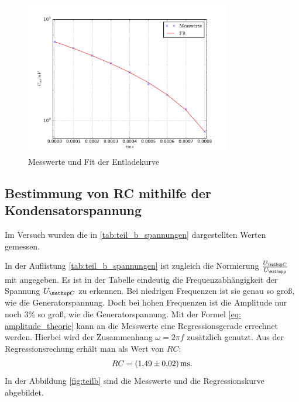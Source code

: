 \begin{figure}
  \centering
  \includegraphics [width=0.8\textwidth]{pics/teil_a_entladung.pdf}
  \caption{Messwerte und Fit der Entladekurve}
  \label{fig:plot_teila}
\end{figure}


\subsection{Bestimmung von RC mithilfe der Kondensatorspannung}
Im Versuch wurden die in \ref{tab:teil_b_spannungen} dargestellten Werten gemessen.



In der Auflistung \ref{tab:teil_b_spannungen} ist zugleich die Normierung $\frac{U\ua{C}}{U\ua{g}}$ %
mit angegeben.
Es ist in der Tabelle eindeutig die Frequenzabhängigkeit der Spannung $U\ua{C}$ zu erkennen. %
Bei niedrigen Frequenzen ist sie genau so groß, wie die Generatorspannung. %
Doch bei hohen Frequenzen ist die Amplitude nur noch $3\%$ so groß, wie die  Generatorspannung. %
Mit der Formel \eqref{eq: amplitude_theorie} kann an die Messwerte eine Regressionsgerade
errechnet werden. Hierbei wird der Zusammenhang $\omega=2\pi f$ zusätzlich genutzt.
Aus der Regressionsrechung erhält man als Wert von $RC$:
\begin{equation}
  \label{eq:rc_teilb}
  RC=\SI{1.49\pm0.02}{\milli\second}.
\end{equation}
In der Abbildung \ref{fig:teilb} sind die Messwerte und die Regressionskurve abgebildet. %

